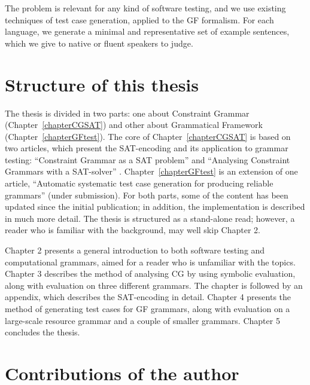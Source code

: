 The problem is relevant for any kind of software testing, and we use existing techniques of test case generation, applied to the GF formalism. For each language, we generate a minimal and representative set of example sentences, which we give to native or fluent speakers to judge.

\section{Structure of this thesis}

The thesis is divided in two parts: one about Constraint Grammar (Chapter~\ref{chapterCGSAT}) and other about Grammatical Framework (Chapter~\ref{chapterGFtest}). The core of Chapter~\ref{chapterCGSAT} is based on two articles, which present the SAT-encoding and its application to grammar testing: ``Constraint Grammar as a SAT problem'' \cite{listenmaa_claessen2015} and ``Analysing Constraint Grammars with a SAT-solver'' \cite{listenmaa_claessen2016}. 
Chapter~\ref{chapterGFtest} is an extension of one article, ``Automatic systematic test case generation for producing reliable grammars'' \cite{listenmaa_claessen2018} (under submission). For both parts, some of the content has been updated since the initial publication; in addition, the implementation is described in much more detail. The thesis is structured as a stand-alone read; however, a reader who is familiar with the background, may well skip Chapter 2.

Chapter 2 presents a general introduction to both software testing and computational grammars, aimed for a reader who is unfamiliar with the topics.
Chapter 3 describes the method of analysing CG by using symbolic evaluation, along with evaluation on three different grammars.
The chapter is followed by an appendix, which describes the SAT-encoding in detail.
Chapter 4 presents the method of generating test cases for GF grammars, along with evaluation on a large-scale resource grammar and a couple of smaller grammars.
Chapter 5 concludes the thesis.


\section{Contributions of the author}

